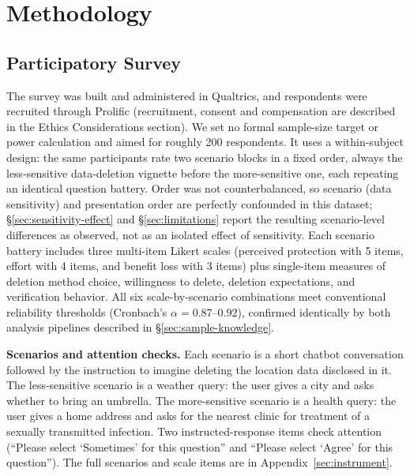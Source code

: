 \documentclass[conference,compsoc]{IEEEtran}
\begin{document}
\section{Methodology}
\label{sec:methodology}

\subsection{Participatory Survey}
\label{sec:survey-methodology}

The survey was built and administered in Qualtrics, and respondents were
recruited through Prolific (recruitment, consent and compensation are
described in the Ethics Considerations section). We set no formal sample-size
target or power calculation and aimed for roughly 200 respondents. It uses a within-subject design: the same participants rate two
scenario blocks in a fixed order, always the less-sensitive
data-deletion vignette before the more-sensitive one, each repeating an
identical question battery. Order was not counterbalanced, so scenario
(data sensitivity) and presentation order are perfectly confounded in
this dataset; \S\ref{sec:sensitivity-effect} and \S\ref{sec:limitations}
report the resulting scenario-level differences as observed, not as an
isolated effect of sensitivity. Each scenario battery includes
three multi-item Likert scales (perceived protection with 5 items, effort
with 4 items, and benefit loss with 3 items) plus single-item measures of
deletion method choice, willingness to delete, deletion expectations, and
verification behavior. All six scale-by-scenario combinations meet
conventional reliability thresholds (Cronbach's $\alpha=0.87$--$0.92$),
confirmed identically by both analysis pipelines described in
\S\ref{sec:sample-knowledge}.

\textbf{Scenarios and attention checks.} Each scenario is a short
chatbot conversation followed by the instruction to imagine deleting the
location data disclosed in it. The less-sensitive scenario is a weather
query: the user gives a city and asks whether to bring an umbrella. The
more-sensitive scenario is a health query: the user gives a home address
and asks for the nearest clinic for treatment of a sexually transmitted
infection. Two instructed-response items check attention (``Please select
`Sometimes' for this question'' and ``Please select `Agree' for this
question''). The full scenarios and scale items are in Appendix~\ref{sec:instrument}.
\end{document}
